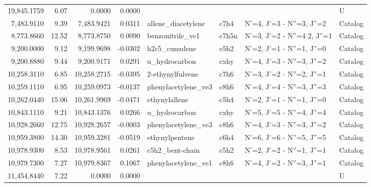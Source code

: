 \begin{longtable}{rrrrllll}
19,845.1759 &      6.07 &            0.0000 &    0.0000 &                             &         &                                      &          U \\
 7,483.9110 &      9.39 &        7,483.9421 &    0.0311 &          allene_diacetylene &    c7h4 &            N'=4, J'=3 - N''=3, J''=2 &    Catalog \\
 8,773.8660 &     12.52 &        8,773.8750 &    0.0090 &            benzonitrile_ve1 &   c7h5n &      N'=3, J'=2 - N''=4     2, J''=1 &    Catalog \\
 9,200.0000 &      9.12 &        9,199.9698 &   -0.0302 &               h2c5_cumulene &    c5h2 &            N'=2, J'=1 - N''=1, J''=0 &    Catalog \\
 9,200.8880 &      9.44 &        9,200.9171 &    0.0291 &               u_hydrocarbon &    cxhy &            N'=4, J'=3 - N''=3, J''=2 &    Catalog \\
10,258.3110 &      6.85 &       10,258.2715 &   -0.0395 &            2-ethynylfulvene &    c7h6 &            N'=3, J'=2 - N''=2, J''=1 &    Catalog \\
10,259.1110 &      6.95 &       10,259.0973 &   -0.0137 &         phenylacetylene_ve3 &    c8h6 &            N'=4, J'=4 - N''=3, J''=3 &    Catalog \\
10,262.0440 &     15.06 &       10,261.9969 &   -0.0471 &               ethynylallene &    c5h4 &            N'=2, J'=1 - N''=1, J''=0 &    Catalog \\
10,843.1110 &      9.21 &       10,843.1376 &    0.0266 &               u_hydrocarbon &    cxhy &            N'=5, J'=5 - N''=4, J''=4 &    Catalog \\
10,928.2660 &     12.75 &       10,928.2657 &   -0.0003 &         phenylacetylene_ve3 &    c8h6 &            N'=4, J'=3 - N''=3, J''=2 &    Catalog \\
10,959.3800 &     14.30 &       10,959.3281 &   -0.0519 &              ethynylpentene &    c6h4 &            N'=6, J'=6 - N''=5, J''=5 &    Catalog \\
10,978.9300 &      8.53 &       10,978.9561 &    0.0261 &             c5h2_bent-chain &    c5h2 &            N'=2, J'=2 - N''=1, J''=1 &    Catalog \\
10,979.7300 &      7.27 &       10,979.8367 &    0.1067 &         phenylacetylene_ve1 &    c8h6 &            N'=4, J'=2 - N''=3, J''=1 &    Catalog \\
11,454.8440 &      7.22 &            0.0000 &    0.0000 &                             &         &                                      &          U \\

\end{longtable}
